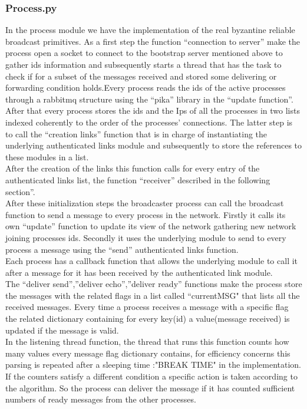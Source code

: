 \documentclass[12pt]{article}
\begin{document}
\subsubsection{Process.py}
In the process module we have the implementation of the real byzantine reliable broadcast primitives. As a first step the function “connection to server” make the process open a socket to connect to the bootstrap server mentioned above to gather ids information and subsequently starts a thread that has the task to check if for a subset of the messages received and stored some delivering or forwarding condition holds.Every process reads the ids of the active processes through a rabbitmq structure using the “pika” library in the “update function”.\\ After that every process stores the ids and the Ips of all the processes in two lists indexed coherently to the order of the processes' connections. The latter step is to call the “creation links” function that is in charge of instantiating the underlying authenticated links module and subsequently to store the references to these modules in a list.\\ After the creation of the links this function calls for every entry of the authenticated links list, the function “receiver” described in the following section”.\\
After these initialization steps the broadcaster process can call the broadcast function to send a message to every process in the network. Firstly it calls its own “update” function to update its view of the network gathering new network joining processes ids. 
Secondly it uses the underlying module to send to every process a message using the “send” authenticated links function.\\
Each process has a callback function that allows the underlying module to call it after a message for it has been received by the authenticated link module.\\
The “deliver send”,”deliver echo”,”deliver ready” functions make the process store the messages with the related flags in a list called “currentMSG" that lists all the received messages. Every time a process receives a message with a specific flag the related dictionary containing for every key(id) a value(message received) is updated if the message is valid. \\In the listening thread function, the thread that runs this function counts how many values every message flag dictionary contains, for efficiency concerns this parsing is repeated after a sleeping time :"BREAK TIME" in the implementation. If the counters satisfy a different condition a specific action is taken according to the algorithm. So the process can deliver the message if it has counted sufficient numbers of ready messages from the other processes. \\
\end{document}
